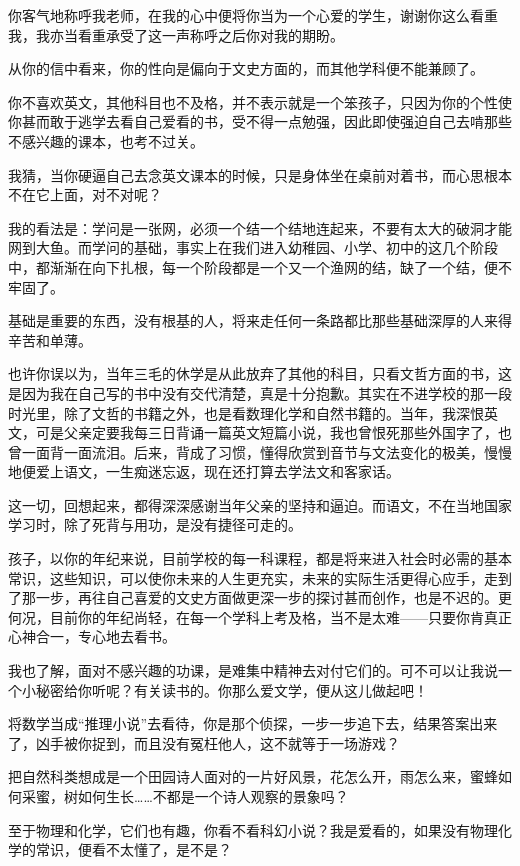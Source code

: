 \par {}
\par 你客气地称呼我老师，在我的心中便将你当为一个心爱的学生，谢谢你这么看重我，我亦当看重承受了这一声称呼之后你对我的期盼。
\par 从你的信中看来，你的性向是偏向于文史方面的，而其他学科便不能兼顾了。
\par 你不喜欢英文，其他科目也不及格，并不表示就是一个笨孩子，只因为你的个性使你甚而敢于逃学去看自己爱看的书，受不得一点勉强，因此即使强迫自己去啃那些不感兴趣的课本，也考不过关。
\par 我猜，当你硬逼自己去念英文课本的时候，只是身体坐在桌前对着书，而心思根本不在它上面，对不对呢？
\par 我的看法是：学问是一张网，必须一个结一个结地连起来，不要有太大的破洞才能网到大鱼。而学问的基础，事实上在我们进入幼稚园、小学、初中的这几个阶段中，都渐渐在向下扎根，每一个阶段都是一个又一个渔网的结，缺了一个结，便不牢固了。
\par 基础是重要的东西，没有根基的人，将来走任何一条路都比那些基础深厚的人来得辛苦和单薄。
\par 也许你误以为，当年三毛的休学是从此放弃了其他的科目，只看文哲方面的书，这是因为我在自己写的书中没有交代清楚，真是十分抱歉。其实在不进学校的那一段时光里，除了文哲的书籍之外，也是看数理化学和自然书籍的。当年，我深恨英文，可是父亲定要我每三日背诵一篇英文短篇小说，我也曾恨死那些外国字了，也曾一面背一面流泪。后来，背成了习惯，懂得欣赏到音节与文法变化的极美，慢慢地便爱上语文，一生痴迷忘返，现在还打算去学法文和客家话。
\par 这一切，回想起来，都得深深感谢当年父亲的坚持和逼迫。而语文，不在当地国家学习时，除了死背与用功，是没有捷径可走的。
\par 孩子，以你的年纪来说，目前学校的每一科课程，都是将来进入社会时必需的基本常识，这些知识，可以使你未来的人生更充实，未来的实际生活更得心应手，走到了那一步，再往自己喜爱的文史方面做更深一步的探讨甚而创作，也是不迟的。更何况，目前你的年纪尚轻，在每一个学科上考及格，当不是太难——只要你肯真正心神合一，专心地去看书。
\par 我也了解，面对不感兴趣的功课，是难集中精神去对付它们的。可不可以让我说一个小秘密给你听呢？有关读书的。你那么爱文学，便从这儿做起吧！
\par 将数学当成“推理小说”去看待，你是那个侦探，一步一步追下去，结果答案出来了，凶手被你捉到，而且没有冤枉他人，这不就等于一场游戏？
\par 把自然科类想成是一个田园诗人面对的一片好风景，花怎么开，雨怎么来，蜜蜂如何采蜜，树如何生长……不都是一个诗人观察的景象吗？
\par 至于物理和化学，它们也有趣，你看不看科幻小说？我是爱看的，如果没有物理化学的常识，便看不太懂了，是不是？
